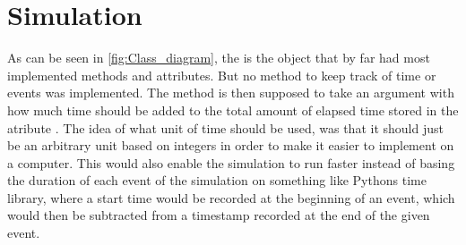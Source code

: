 \section{Simulation}
As can be seen in \autoref{fig:Class_diagram}, the  is the object that by far had most implemented methods and attributes. But no method to keep track of time or events was implemented. The method  is then supposed to take an argument with how much time should be added to the total amount of elapsed time stored in the atribute . The idea of what unit of time should be used, was that it should just be an arbitrary unit based on integers in order to make it easier to implement on a computer. This would also enable the simulation to run faster instead of basing the duration of each event of the simulation on something like Pythons time library, where a start time would be recorded at the beginning of an event, which would then be subtracted from a timestamp recorded at the end of the given event.



































